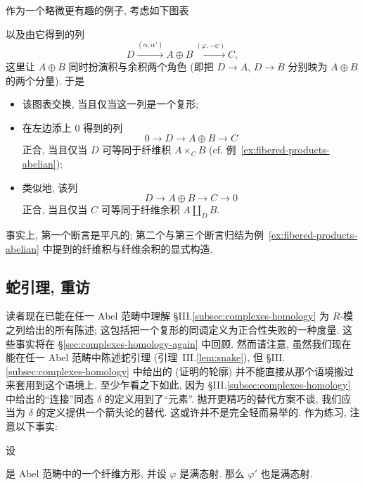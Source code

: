 \begin{example}\label{ex:pullback-sequence}
作为一个略微更有趣的例子, 考虑如下图表
\begin{center}
\end{center}
以及由它得到的列
\[
D \xrightarrow{(\alpha,\alpha')} A\oplus B \xrightarrow{(\varphi,-\psi)} C,
\]
这里让 $A\oplus B$ 同时扮演积与余积两个角色 (即把 $D\to A$, $D\to B$ 分别映为 $A\oplus B$ 的两个分量). 于是
\begin{itemize}
\item 该图表交换, 当且仅当这一列是一个复形;
\item 在左边添上 $0$ 得到的列
\[
0\to D\to A\oplus B\to C
\]
正合, 当且仅当 $D$ 可等同于纤维积 $A\times_C B$ (cf. 例~\ref{ex:fibered-products-abelian});
\item 类似地, 该列
\[
D\to A\oplus B\to C\to 0
\]
正合, 当且仅当 $C$ 可等同于纤维余积 $A\amalg_D B$.
\end{itemize}
\end{example}
\indent 事实上, 第一个断言是平凡的; 第二个与第三个断言归结为例~\ref{ex:fibered-products-abelian} 中提到的纤维积与纤维余积的显式构造.

\subsection{蛇引理, 重访}
\label{subsec:snake-lemma-again}

读者现在已能在任一 Abel 范畴中理解 §III.\ref{subsec:complexes-homology} 为 $R$-模之列给出的所有陈述; 这包括把一个复形的同调定义为正合性失败的一种度量. 这些事实将在 \S\ref{sec:complexes-homology-again} 中回顾. 然而请注意, 虽然我们现在能在任一 Abel 范畴中陈述蛇引理 (引理~III.\ref{lem:snake}), 但 §III.\ref{subsec:complexes-homology} 中给出的 (证明的轮廓) 并不能直接从那个语境搬过来套用到这个语境上, 至少乍看之下如此, 因为 §III.\ref{subsec:complexes-homology} 中给出的``连接''同态 $\delta$ 的定义用到了``元素''. 抛开更精巧的替代方案不谈, 我们应当为 $\delta$ 的定义提供一个箭头论的替代.
这或许并不是完全轻而易举的.
作为练习, 注意以下事实:

\begin{lemma}\label{lem:pullback-epi}
设
\begin{center}
\end{center}
是 Abel 范畴中的一个纤维方形, 并设 $\varphi$ 是满态射. 那么 $\varphi'$ 也是满态射.
\end{lemma}

